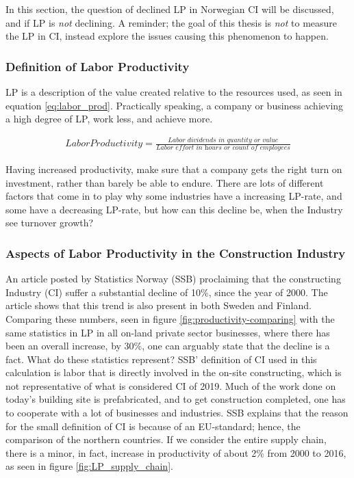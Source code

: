 In this section, the question of declined LP in Norwegian CI will be discussed, and if LP is \textit{not} declining. A reminder; the goal of this thesis is \textit{not} to measure the LP in CI, instead explore the issues causing this phenomenon to happen.

\subsubsection{Definition of Labor Productivity}
LP is a description of the value created relative to the resources used, as seen in equation \ref{eq:labor_prod}. Practically speaking, a company or business achieving a high degree of LP, work less, and achieve more. 

\begin{eqnarray}\label{eq:labor_prod}
Labor Productivity = \frac{\textit{Labor dividends in quantity or value}}{\textit{Labor effort in hours or count of employees}} 
\end{eqnarray}

Having increased productivity, make sure that a company gets the right turn on investment, rather than barely be able to endure. There are lots of different factors that come in to play why some industries have a increasing LP-rate, and some have a decreasing LP-rate, but how can this decline be, when the Industry see turnover growth?

\subsubsection{Aspects of Labor Productivity in the Construction Industry}
An article \cite{ssb_productivity} posted by Statistics Norway (SSB) proclaiming that the constructing Industry (CI) suffer a substantial decline of 10\%, since the year of 2000. The article shows that this trend is also present in both Sweden and Finland. Comparing these numbers, seen in figure \ref{fig:productivity-comparing} with the same statistics in LP in all on-land private sector businesses, where there has been an overall increase, by 30\%, one can arguably state that the decline is a fact. What do these statistics represent? SSB' definition of CI used in this calculation is labor that is directly involved in the on-site constructing, which is not representative of what is considered CI of 2019. Much of the work done on today's building site is prefabricated, and to get construction completed, one has to cooperate with a lot of businesses and industries. SSB explains that the reason for the small definition of CI is because of an EU-standard; hence, the comparison of the northern countries. If we consider the entire supply chain, there is a minor, in fact, increase in productivity of about 2\% from 2000 to 2016, as seen in figure \ref{fig:LP_supply_chain}.

